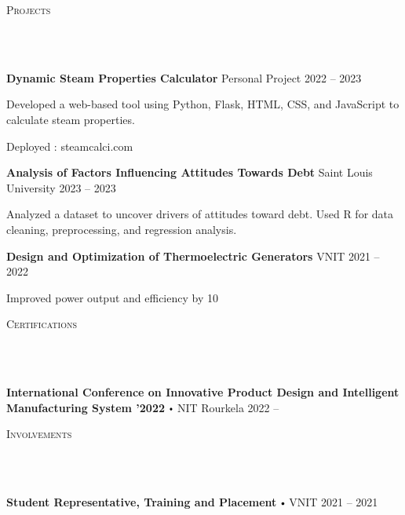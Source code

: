 \documentclass{article}
\newcommand{\project}[4]{{
          \vspace*{2pt}%
          \textbf{#1} #2 \hfill #3\\ #4 \vspace*{2pt}}
          }
\newcommand{\lineunder}{
        \vspace*{-8pt} \\ \hspace*{-18pt} 
        \hrulefill \\
        }
\newcommand{\header}[1]{{
        \hspace*{-15pt}\vspace*{6pt} \textsc{#1}} \vspace*{-6pt} 
        \lineunder
        }
\renewcommand{\labelitemi}{
        $\vcenter{\hbox{\tiny$\bullet$}}$\hspace*{3pt}
        }
\renewcommand{\labelitemii}{
        $\vcenter{\hbox{\tiny$\bullet$}}$\hspace*{-3pt}
        }
\newenvironment{bullet-list-major}{
          \begin{list}{\labelitemii}{\setlength\leftmargin{3pt} 
          \topsep 0pt \itemsep -2pt}}{\vspace*{4pt}\end{list}
          }
\newenvironment{bullet-list-minor}{
          \begin{list}{\labelitemii}{\setlength\leftmargin{15pt} 
            \topsep 0pt \itemsep -2pt}}{\vspace*{4pt}\end{list}
            }
\begin{document}
      \vspace*{4pt}%
      \header{Projects}
      {
      \project{Dynamic Steam Properties Calculator}{Personal Project}{2022 -- 2023}{
          \begin{bullet-list-minor}
              \item Developed a web-based tool using Python, Flask, HTML, CSS, and JavaScript to calculate steam properties.
\item Deployed : steamcalci.com
          \end{bullet-list-minor}
      }
  

      \project{Analysis of Factors Influencing Attitudes Towards Debt}{Saint Louis University}{2023 -- 2023}{
          \begin{bullet-list-minor}
              \item Analyzed a dataset to uncover drivers of attitudes toward debt. Used R for data cleaning, preprocessing, and regression analysis.
          \end{bullet-list-minor}
      }
  

      \project{Design and Optimization of Thermoelectric Generators}{VNIT}{2021 -- 2022}{
          \begin{bullet-list-minor}
              \item Improved power output and efficiency by 10%
          \end{bullet-list-minor}
      }
  }
  
      \vspace*{4pt}%
      \header{Certifications}
      {
        \begin{bullet-list-major}
        \item \textbf{International Conference on Innovative Product Design and Intelligent Manufacturing System ’2022} \labelitemi NIT Rourkela \hfill 2022 -- 
        \end{bullet-list-major}
        }
      \vspace*{4pt}%
      \header{Involvements}
      {
            \begin{bullet-list-major}
            \item \textbf{Student Representative, Training and Placement} \labelitemi VNIT \hfill 2021 -- 2021
            
            \end{bullet-list-major}
            }
      
\end{document}
